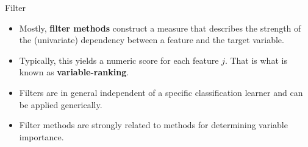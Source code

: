 








\begin{vbframe}{Filter}

\begin{itemize}
  \item Mostly, \textbf{filter methods} construct a measure that describes the strength of the (univariate) dependency between a feature and the target variable.
  \item Typically, this yields a numeric score for each feature $j$.
  That is what is known as \textbf{variable-ranking}.
  \item Filters are in general independent of a specific classification learner and can be applied generically.
    \item Filter methods are strongly related to methods for determining variable importance.
\end{itemize}
\end{vbframe}

